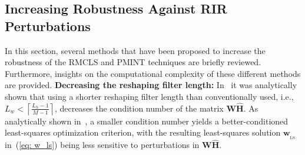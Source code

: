\documentclass[fleqn]{aes2e}
\begin{document}
\subsection{Increasing Robustness Against RIR Perturbations}
\label{sec: robust_sec}
In this section, several methods that have been proposed to increase the robustness of the RMCLS and PMINT techniques are briefly reviewed.
Furthermore, insights on the computational complexity of these different methods are provided.
\vskip 2pt
\textbf{Decreasing the reshaping filter length:} \enspace
In~\cite{Kodrasi_EUSIPCO_2012} it was analytically shown that using a shorter reshaping filter length than conventionally used, i.e., $L_w < \left\lceil{\frac{L_h-1}{M-1}}\right\rceil$, decreases the condition number of the matrix $\mathbf{W}\hat{\mathbf{H}}$.
As analytically shown in~\cite{Wedin_1973}, a smaller condition number yields a better-conditioned least-squares optimization criterion, with the resulting least-squares solution $\mathbf{w}_{_{\text{LS}}}$ in~(\ref{eq: w_ls}) being less sensitive to perturbations in $\mathbf{W}\hat{\mathbf{H}}$.
\end{document}
